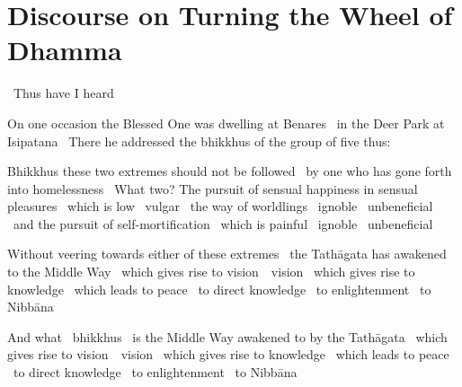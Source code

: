 
\section{Discourse on Turning the Wheel of Dhamma}
\label{wheel-of-dhamma-full}

\begin{leader-english}
  \anglebracketleft\ \hspace{-0.5mm}Thus have I heard \hspace{-0.5mm}\anglebracketright\
\end{leader-english}

\begin{english-only-hang}
  On one occasion the Blessed One was dwelling at Benares \breathmark\ in the Deer Park at Isipatana \breathmark\ There he addressed the bhikkhus of the group of five thus:
\end{english-only-hang}

\begin{english-only-hang}
  Bhikkhus these two extremes should not be followed \breathmark\ by one who has gone forth into homelessness \breathmark\ What two? The pursuit of sensual happiness in sensual pleasures \breathmark\ which is low \breathmark\ vulgar \breathmark\ the way of worldlings \breathmark\ ignoble \breathmark\ unbeneficial \breathmark\ and the pursuit of self-mortification \breathmark\ which is painful \breathmark\ ignoble \breathmark\ unbeneficial
\end{english-only-hang}

\begin{english-only-hang}
  Without veering towards either of these extremes \breathmark\ the Tathāgata has awakened to the Middle Way \breathmark\ which gives rise to \ifbfiveversion \mbox{vision}~\breathmark\ \else vision \breathmark\ \fi which gives rise to knowledge \breathmark\ which leads to peace \breathmark\ to direct knowledge \breathmark\ to enlightenment \breathmark\ to Nibbāna
\end{english-only-hang}

\begin{english-only-hang}
  And what \breathmark\ bhikkhus \breathmark\ is the Middle Way awakened to by the Tathāgata \breathmark\ which gives rise to \ifbfiveversion \mbox{vision}~\breathmark\ \else vision \breathmark\ \fi which gives rise to knowledge \breathmark\ which leads to peace \breathmark\ to direct knowledge \breathmark\ to enlightenment \breathmark\ to Nibbāna
\end{english-only-hang}

